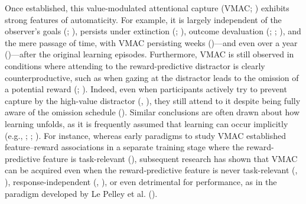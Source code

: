 \documentclass[
  man,
  floatsintext,
  longtable,
  nolmodern,
  notxfonts,
  notimes,
  mask,
  colorlinks=true,linkcolor=blue,citecolor=blue,urlcolor=blue]{apa7}
\begin{document}
Once established, this value-modulated attentional capture (VMAC;
) exhibits strong
features of automaticity. For example, it is largely independent of the
observer's goals (;
), persists under
extinction (;
), outcome
devaluation (;
;
), and the mere passage of
time, with VMAC persisting weeks
()---and
even over a year ()---after the original learning episodes. Furthermore, VMAC is
still observed in conditions where attending to the reward-predictive
distractor is clearly counterproductive, such as when gazing at the
distractor leads to the omission of a potential reward
(;
). Indeed, even when
participants actively try to prevent capture by the high-value
distractor (,
), they still attend to it despite being
fully aware of the omission schedule (). Similar conclusions are often drawn about how learning
unfolds, as it is frequently assumed that learning can occur implicitly
(e.g., ;
;
). For instance,
whereas early paradigms to study VMAC established feature--reward
associations in a separate training stage where the reward-predictive
feature is task-relevant (), subsequent research has shown that VMAC can be acquired even
when the reward-predictive feature is never task-relevant
(,
), response-independent
(,
), or even detrimental for performance,
as in the paradigm developed by Le Pelley et al.
().
\end{document}

